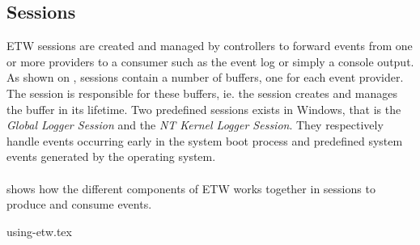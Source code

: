\documentclass{report}
\begin{document}
\subsection{Sessions}
\gls{ETW} sessions are created and managed by controllers to forward events from one or more providers to a consumer such as the event log or simply a console output. As shown on , sessions contain a number of buffers, one for each event provider. The session is responsible for these buffers, ie. the session creates and manages the buffer in its lifetime. Two predefined sessions exists in Windows, that is the \emph{Global Logger Session} and the \emph{NT Kernel Logger Session}. They respectively handle events occurring early in the system boot process and predefined system events generated by the operating system\cite{url:etw:trace:sessions}.
\\
\\
 shows how the different components of \gls{ETW} works together in sessions to produce and consume events.

{using-etw.tex}
\end{document}
